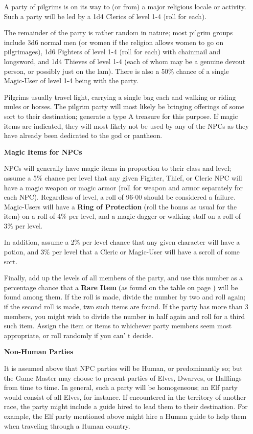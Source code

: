 \documentclass[a4paper,twoside,openany,10pt]{book}
\begin{document}
\begin{multicols}{2}
A party of pilgrims is on its way to (or from) a major religious locale or activity. Such a party will be led by a 1d4 Clerics of level 1-4 (roll for each).

The remainder of the party is rather random in nature; most pilgrim groups include 3d6 normal men (or women if the religion allows women to go on pilgrimages), 1d6 Fighters of level 1-4 (roll for each) with chainmail and longsword, and 1d4 Thieves of level 1-4 (each of whom may be a genuine devout person, or possibly just on the lam). There is also a 50\% chance of a single Magic-User of level 1-4 being with the party. 

Pilgrims usually travel light, carrying a single bag each and walking or riding mules or horses. The pilgrim party will most likely be bringing offerings of some sort to their destination; generate a type A treasure for this purpose. If magic items are indicated, they will most likely not be used by any of the NPCs as they have already been dedicated to the god or pantheon.

\textbf{Magic Items for NPCs}

NPCs will generally have magic items in proportion to their class and level; assume a 5\% chance per level that any given Fighter, Thief, or Cleric NPC will have a magic weapon or magic armor (roll for weapon and armor separately for each NPC). Regardless of level, a roll of 96-00 should be considered a failure. Magic-Users will have a \textbf{Ring of Protection} (roll the bonus as usual for the item) on a roll of 4\% per level, and a magic dagger or walking staff on a roll of 3\% per level.

In addition, assume a 2\% per level chance that any given character will have a potion, and 3\% per level that a Cleric or Magic-User will have a scroll of some sort.

Finally, add up the levels of all members of the party, and use this number as a percentage chance that a \textbf{Rare Item} (as found on the table on page \hyperlink{rare-items}{\pageref{rare-items}}) will be found among them. If the roll is made, divide the number by two and roll again; if the second roll is made, two such items are found. If the party has more than 3 members, you might wish to divide the number in half again and roll for a third such item. Assign the item or items to whichever party members seem most appropriate, or roll randomly if you can' t decide.

\textbf{Non-Human Parties}

It is assumed above that NPC parties will be Human, or predominantly so; but the Game Master may choose to present parties of Elves, Dwarves, or Halflings from time to time. In general, such a party will be homogeneous; an Elf party would consist of all Elves, for instance. If encountered in the territory of another race, the party might include a guide hired to lead them to their destination. For example, the Elf party mentioned above might hire a Human guide to help them when traveling through a Human country.


\end{multicols}
\end{document}
